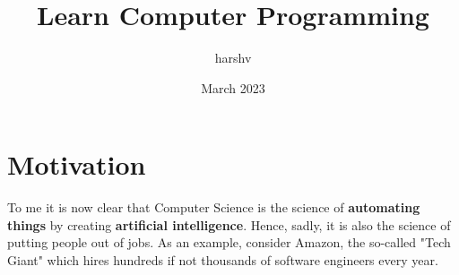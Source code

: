 \documentclass{article}
\title{Learn Computer Programming}
\author{harshv}
\date{March 2023}
\begin{document}
\maketitle

\section{Motivation}
To me it is now clear that Computer Science is the science of \textbf{automating things}
by creating \textbf{artificial intelligence}. 
Hence, sadly, it is also the science of putting people out of jobs. As an example,
consider Amazon, the so-called "Tech Giant" which hires hundreds if not thousands 
of software engineers every year. 
\end{document}
